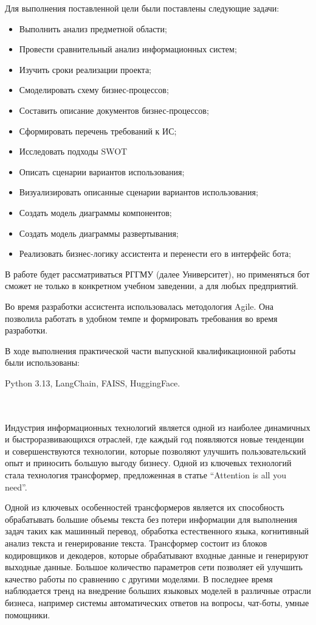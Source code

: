 Для выполнения поставленной цели были поставлены следующие задачи:
\begin{itemize}
    \item Выполнить анализ предметной области;
    \item Провести сравнительный анализ информационных систем;
    \item Изучить сроки реализации проекта;
    \item Смоделировать схему бизнес-процессов;
    \item Составить описание документов бизнес-процессов;
    \item Сформировать перечень требований к ИС;
    \item Исследовать подходы SWOT
    \item Описать сценарии вариантов использования;
    \item Визуализировать описанные сценарии вариантов использования;
    \item Создать модель диаграммы компонентов;
    \item Создать модель диаграммы развертывания;
    \item Реализовать бизнес-логику ассистента и перенести его в интерфейс бота;
\end{itemize}

В работе будет рассматриваться РГГМУ (далее Университет), но применяться бот
сможет не только в конкретном учебном заведении, а для любых предприятий.

Во время разработки ассистента использовалась методология Agile. Она позволила
работать в удобном темпе и формировать требования во время разработки.

В ходе выполнения практической части выпускной квалификационной
работы были использованы:

Python 3.13, LangChain, FAISS, HuggingFace.

\\
\\

Индустрия информационных технологий является одной из наиболее динамичных и 
быстроразвивающихся отраслей, где каждый год появляются новые тенденции и
совершенствуются технологии, которые позволяют улучшить пользовательский опыт 
и приносить большую выгоду бизнесу. Одной из ключевых технологий стала 
технология трансформер, предложенная в статье “Attention is all you need”.

Одной из ключевых особенностей трансформеров является их способность 
обрабатывать большие объемы текста без потери информации для выполнения задач
таких как машинный перевод, обработка естественного языка, когнитивный анализ
текста и генерирование текста. Трансформер состоит из блоков кодировщиков и
декодеров, которые обрабатывают входные данные и генерируют выходные данные.
Большое количество параметров сети позволяет ей улучшить качество работы по 
сравнению с другими моделями. В последнее время наблюдается тренд
на внедрение больших языковых моделей в различные отрасли бизнеса, например
системы автоматических ответов на вопросы, чат-боты, умные помощники. 

